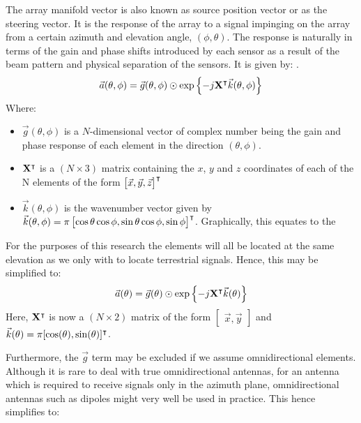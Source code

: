 The array manifold vector is also known as source position vector or as the steering vector. It is the response of the array to a signal impinging on the array from a certain azimuth and elevation angle, \((\phi, \theta)\). The response is naturally in terms of the gain and phase shifts introduced by each sensor as a result of the beam pattern and physical separation of the sensors. It is given by:
\cite{dacos1995estimating}.
\begin{equation}
\vec{a}(\theta, \phi) = \vec{g}(\theta, \phi) \odot \exp \left\{ -j \mathbf{X}^\intercal \vec{k}(\theta,\phi) \right\}
\end{equation}
Where:
\begin{itemize}
  \item \(\vec{g}(\theta, \phi)\) is a \(N\)-dimensional vector of complex number being the gain and phase response  of each element in the direction \((\theta, \phi)\). 
\item \(\mathbf{X}^\intercal\) is a \((N \times 3)\) matrix containing the \(x\), \(y\) and \(z\) coordinates of each of the N elements of the form \(\begin{bmatrix} \vec{x}, \vec{y}, \vec{z} \end{bmatrix}^\intercal\)
\item \(\vec{k}(\theta, \phi)\) is the wavenumber vector given by \(\vec{k}(\theta, \phi) = \pi \begin{bmatrix} \cos\theta\cos\phi, \sin\theta\cos\phi, \sin\phi \end{bmatrix}^\intercal \). Graphically, this equates to the 
\end{itemize}
For the purposes of this research the elements will all be located at the same elevation as we only with to locate terrestrial signals. Hence, this may be simplified to:
\begin{equation}
  \vec{a}(\theta) = \vec{g}(\theta) \odot \exp \left\{ -j \mathbf{X}^\intercal \vec{k}(\theta) \right\}
\end{equation}
Here, \(\mathbf{X}^\intercal\) is now a \((N \times 2)\) matrix of the form \(\begin{bmatrix} \vec{x}, \vec{y} \end{bmatrix}\) and \(\vec{k}(\theta) = \pi[\cos(\theta), \sin(\theta)]^\intercal\).

Furthermore, the \(\vec{g}\) term may be excluded if we assume omnidirectional elements. Although it is rare to deal with true omnidirectional antennas, for an antenna which is required to receive signals only in the azimuth plane, omnidirectional antennas such as dipoles might very well be used in practice. This hence simplifies to:

